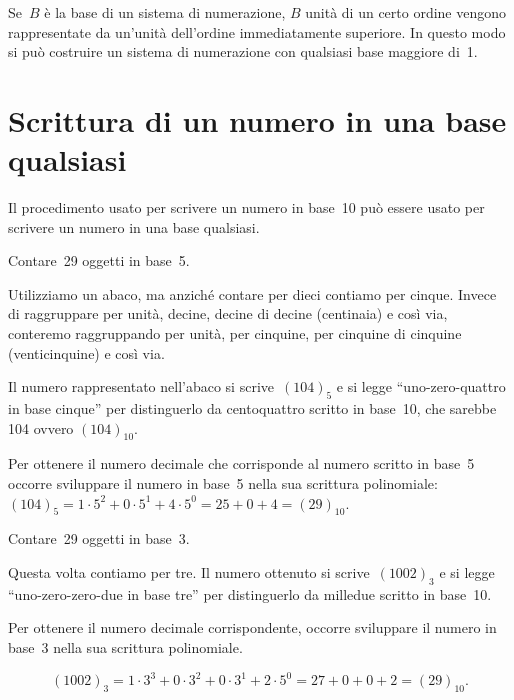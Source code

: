 Se~$B$ è la base di un sistema di numerazione, $B$ unità di un certo
ordine vengono rappresentate da un'unità dell'ordine immediatamente superiore.
In questo modo si può costruire un sistema di numerazione con
qualsiasi base maggiore di~1.

\section{Scrittura di un numero in una base qualsiasi}
Il procedimento usato per scrivere un numero in base~10 può essere
usato per scrivere un numero in una base qualsiasi.

\begin{exrig}
\begin{esempio}
Contare~29 oggetti in base~5.
\begin{multicols}{2}

Utilizziamo un abaco, ma 
anziché contare per dieci contiamo per cinque. Invece di
raggruppare per unità, decine, decine di decine (centinaia) e così via,
conteremo raggruppando per unità, per cinquine, per cinquine di
cinquine (venticinquine) e così via.
\begin{center}

\end{center}
\end{multicols}
Il numero rappresentato nell'abaco si scrive~$(104)_{5}$ e si legge
``uno-zero-quattro in base cinque'' per distinguerlo da centoquattro scritto in
base~10, che sarebbe 104 ovvero $(104)_{10}$.

Per ottenere il numero decimale che corrisponde al numero scritto in
base~5 occorre sviluppare il numero in base~5 nella sua scrittura
polinomiale:~$(104)_{5}=1\cdot 5^{2}+0\cdot 5^{1}+4\cdot5^{0}=25+0+4=(29)_{10}$.
\end{esempio}
\pagebreak
\begin{esempio}
Contare~29 oggetti in base~3.
\begin{multicols}{2}
Questa volta contiamo per tre.
Il numero ottenuto si scrive~$(1002)_{3}$ e si legge
``uno-zero-zero-due in base tre'' per distinguerlo da milledue scritto in base~10.

Per ottenere il numero decimale corrispondente, occorre sviluppare il numero in base~3 nella sua scrittura
polinomiale.
 \begin{center}
 
 \end{center}
\end{multicols}
\[(1002)_{3}=1\cdot 3^{3}+0\cdot 3^{2}+0\cdot 3^{1}+2\cdot5^{0}=27+0+0+2=(29)_{10}.\]

\end{esempio}
\end{exrig}


